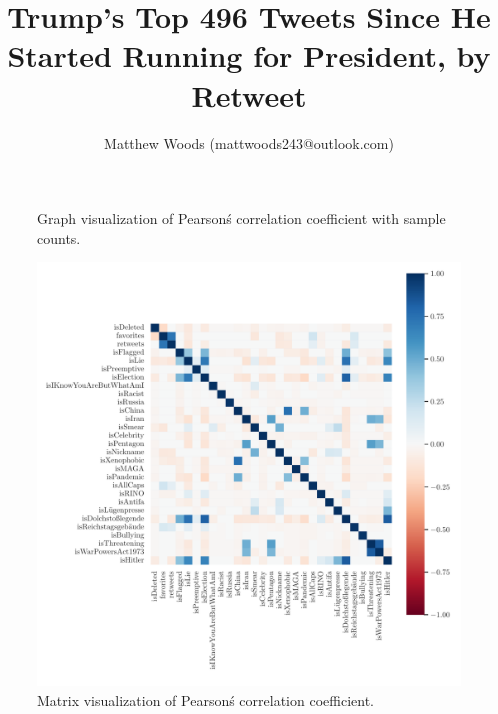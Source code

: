 \documentclass{article}
\begin{document}
    \title{Trump's Top 496 Tweets Since He Started Running for President, by Retweet}
    \author{Matthew Woods (mattwoods243@outlook.com)}
    \maketitle
    
    
    
    \begin{figure}
         \hspace{-1.5cm}
         
         \caption{Graph visualization of Pearson\'s correlation coefficient with sample counts.}
    \end{figure}
 
    \begin{figure}
         \vspace{-4cm}
         \hspace{-3cm}
         \includegraphics[scale=.8]{corr_heatmap.pdf}
         \caption{Matrix visualization of Pearson\'s correlation coefficient.}
    \end{figure}
   
    
    
\end{document}
